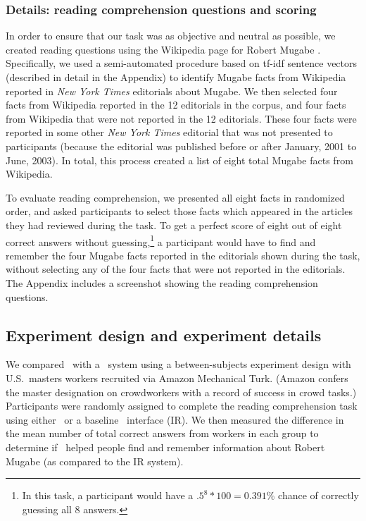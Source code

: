 \subsubsection{Details: reading comprehension questions and scoring}

In order to ensure that our task was as objective and neutral as possible, we created reading questions using the Wikipedia page for Robert Mugabe \cite{wikimugabe}.
Specifically, we used a semi-automated procedure based on tf-idf sentence vectors (described in detail in the Appendix) to identify Mugabe facts from Wikipedia reported in \textit{New York Times} editorials about Mugabe.
We then selected four facts from Wikipedia reported in the 12 editorials in the corpus, and four facts from Wikipedia that were not reported in the 12 editorials. These four facts were reported in some other \textit{New York Times} editorial that was not presented to participants (because the editorial was published before or after January, 2001 to June, 2003). In total, this process created a list of eight total Mugabe facts from Wikipedia.


To evaluate reading comprehension, we presented all eight facts in randomized order, and asked participants to select those facts which appeared in the articles they had reviewed during the task.
To get a perfect score of eight out of eight correct answers without guessing,\footnote{In this task, a participant would have a $.5^8 * 100 = 0.391\%$ chance of correctly guessing all 8 answers.} a participant would have to find and remember the four Mugabe facts reported in the editorials shown during the task, without selecting any of the four facts that were not reported in the editorials. 
The Appendix includes a screenshot showing the reading comprehension questions.


\subsection{Experiment design and experiment details}

We compared \ours~with a \Baselongname~system using a between-subjects experiment design with U.S.\ masters workers recruited via Amazon Mechanical Turk. (Amazon confers the master designation on crowdworkers with a record of success in crowd tasks.)
Participants were randomly assigned to complete the reading comprehension task using either \ours~or a baseline \Baselongname~interface (IR). We then measured the difference in the mean number of total correct answers from workers in each group to determine if \ours~helped people find and remember information about Robert Mugabe (as compared to the IR system).

